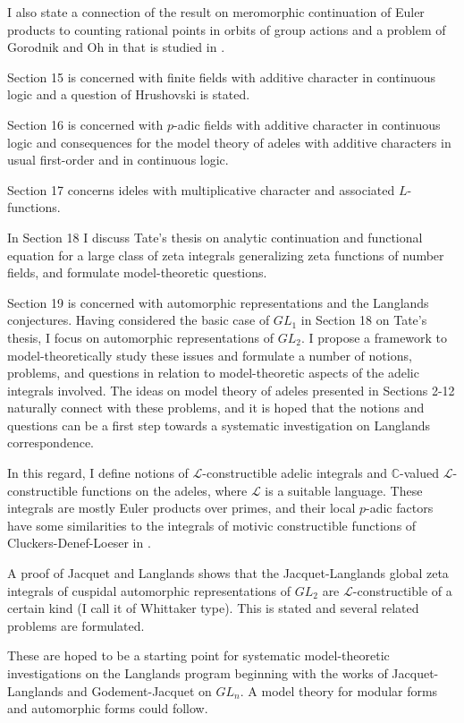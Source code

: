 \documentclass[12pt]{amsart}
\def\C{\mathbb{C}}
\def\cL{\mathcal{L}}
\def\C{\mathbb{C}}
\def\cL{\mathcal{L}}
\numberwithin{equation}{section}
\begin{document}
I also state a connection of the result on meromorphic continuation of Euler products 
to counting rational points in orbits of group actions and a problem of Gorodnik and Oh in \cite{GO} that is studied in \cite{zeta2}.

Section 15 is concerned with finite fields with additive character in continuous logic and a question of Hrushovski is stated.

Section 16 is concerned with $p$-adic fields with additive character in continuous logic and consequences for the model theory of adeles with additive characters in usual first-order and in continuous logic.

Section 17 concerns ideles with multiplicative character and associated $L$-functions. 

In Section 18 I discuss Tate's thesis on analytic continuation and functional equation for a large class of zeta integrals generalizing zeta functions of number fields, and formulate model-theoretic questions.

Section 19 is concerned with automorphic representations and the Langlands conjectures. Having considered the basic case of $GL_1$ in Section 18 on Tate's thesis, I focus on automorphic representations of $GL_2$. I propose a framework to model-theoretically study these issues and formulate a number of notions, problems, and questions in relation to model-theoretic aspects of the adelic integrals involved. The ideas on model theory of adeles presented in Sections 2-12 naturally connect with these problems, and it is hoped that the notions and questions can be a first step towards a systematic investigation on Langlands correspondence. 

In this regard, I define notions of $\cL$-constructible adelic integrals and $\C$-valued $\cL$-constructible functions on the adeles, where $\cL$ is a suitable language. These integrals are mostly Euler products over primes, and their local $p$-adic factors have some similarities to the integrals of motivic constructible functions of Cluckers-Denef-Loeser in \cite{CL2}. 

A proof of Jacquet and Langlands shows that the 
Jacquet-Langlands global zeta integrals of cuspidal automorphic representations of $GL_2$ are $\cL$-constructible of a certain kind (I call it of Whittaker type). This is stated and several related problems are formulated.

These are hoped to be a starting point for systematic model-theoretic investigations on the Langlands program beginning with the works of Jacquet-Langlands and Godement-Jacquet on $GL_n$. 
A model theory for modular forms and automorphic forms could follow. 
\end{document}
